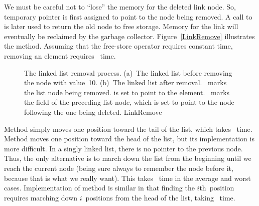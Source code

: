 \begin{progenv}
\end{progenv}
{We must be careful not to ``lose'' the memory for the
deleted link node.
So, temporary pointer  is first assigned to point to the
node being removed.
A call to  is later used to return the old node to free
storage.}{}
{Memory for the link will eventually be reclaimed by the
garbage collector.}{}
Figure~\ref{LinkRemove} illustrates the 
method.
{Assuming that the free-store  operator requires constant
time, removing}{}
an element requires \Thetaone\ time.

\begin{figure}
\vspace{-\smallskipamount}

{The linked list removal process.
(a)~The linked list before removing the node with value~10.
(b)~The linked list after removal.
~marks the list node being removed.
 is set to point to the element.
~marks the  field of the preceding list node,
which is set to point to the node following the one being deleted.}
{LinkRemove}
\bigskip
\end{figure}

Method  simply moves
one position toward the tail of the list, which takes \Thetaone\ time.
Method  moves 
one position toward the head of the list, but its implementation is
more difficult.
In a singly linked list, there is no pointer to the previous node.
Thus, the only alternative is to march down the list from the
beginning until we reach the current node (being sure always to
remember the node before it, because that is what we really want).
This takes \Thetan\ time in the average and worst cases.
Implementation of method  is
similar in that finding the \(i\)th~position requires marching down
\(i\)~positions from the head of the list, taking \Thetai\ time.

